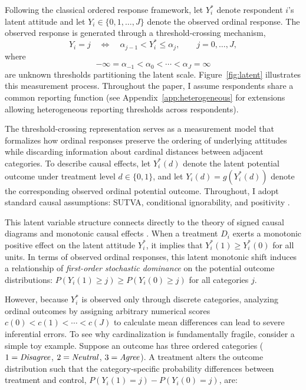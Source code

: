 \documentclass{article}
\begin{document}
Following the classical ordered response framework, let $Y_i^\ast$ denote respondent $i$’s latent attitude and let $Y_i\in\{0,1,\ldots,J\}$ denote the observed ordinal response. The observed response is generated through a threshold-crossing mechanism,
\[
Y_i=j \quad\Longleftrightarrow\quad \alpha_{j-1}<Y_i^\ast\le\alpha_j,
\qquad j=0,\ldots,J,
\]
where
\[
-\infty=\alpha_{-1}<\alpha_0<\cdots<\alpha_J=\infty
\]
are unknown thresholds partitioning the latent scale. Figure~\ref{fig:latent} illustrates this measurement process. Throughout the paper, I assume respondents share a common reporting function (see Appendix~\ref{app:heterogeneous} for extensions allowing heterogeneous reporting thresholds across respondents).

The threshold-crossing representation serves as a measurement model that formalizes how ordinal responses preserve the ordering of underlying attitudes while discarding information about cardinal distances between adjacent categories. To describe causal effects, let $Y_i^\ast(d)$ denote the latent potential outcome under treatment level $d \in \{0,1\}$, and let $Y_i(d) = g\left(Y_i^\ast(d)\right)$ denote the corresponding observed ordinal potential outcome. Throughout, I adopt standard causal assumptions: SUTVA, conditional ignorability, and positivity \citep{Rubin1974a}.

This latent variable structure connects directly to the theory of signed causal diagrams and monotonic causal effects \citep{VanderWeele2010a, VanderWeele2012a}. When a treatment $D_i$ exerts a monotonic positive effect on the latent attitude $Y_i^\ast$, it implies that $Y_i^\ast(1) \ge Y_i^\ast(0)$ for all units. In terms of observed ordinal responses, this latent monotonic shift induces a relationship of \emph{first-order stochastic dominance} on the potential outcome distributions: $P(Y_i(1) \ge j) \ge P(Y_i(0) \ge j)$ for all categories $j$. 

However, because $Y_i^\ast$ is observed only through discrete categories, analyzing ordinal outcomes by assigning arbitrary numerical scores $c(0) < c(1) < \cdots < c(J)$ to calculate mean differences can lead to severe inferential errors. To see why cardinalization is fundamentally fragile, consider a simple toy example. Suppose an outcome has three ordered categories ($1 = \text{\textit{Disagree}}$, $2 = \text{\textit{Neutral}}$, $3 = \text{\textit{Agree}}$). A treatment alters the outcome distribution such that the category-specific probability differences between treatment and control, $P(Y_i(1)=j) - P(Y_i(0)=j)$, are:
\end{document}

